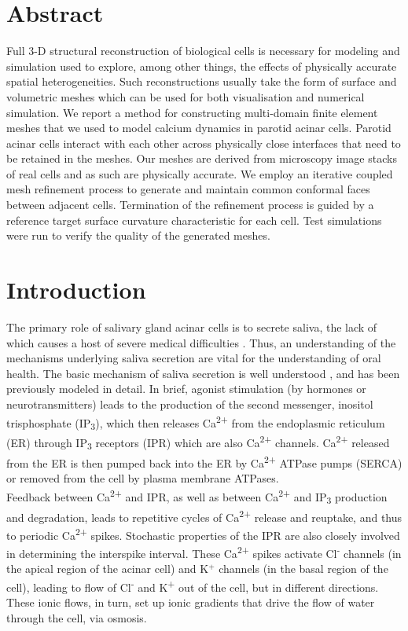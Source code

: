 \documentclass[10pt,letterpaper]{article}
\begin{document}
\section*{Abstract}
Full 3-D structural reconstruction of biological cells is necessary for modeling and simulation used to explore,
among other things, the effects of physically accurate spatial heterogeneities. Such reconstructions usually
take the form of surface and volumetric meshes which can be used for both visualisation and numerical
simulation. We report a method for constructing multi-domain finite element meshes that we used to model
calcium dynamics in parotid acinar cells. Parotid acinar cells interact with each other across physically close
interfaces that need to be retained in the meshes. Our meshes are derived from microscopy image stacks of
real cells and as such are physically accurate. We employ an iterative coupled mesh refinement process to
generate and maintain common conformal faces between adjacent cells. Termination of the refinement
process is guided by a reference target surface curvature characteristic for each cell. Test simulations were
run to verify the quality of the generated meshes.\\

\section*{Introduction}
The primary role of salivary gland acinar cells is to secrete saliva, the lack of which causes a host of severe medical difficulties \cite{fox1985,melvin1991}. Thus, an understanding of the mechanisms underlying saliva secretion are vital for the understanding of oral health.  The basic mechanism of saliva secretion is well understood \cite{nauntofte1992}, and has been previously modeled in detail.
In brief, agonist stimulation (by hormones or neurotransmitters) leads to the production of the second messenger, inositol trisphosphate (IP\textsubscript{3}), which then releases Ca\textsuperscript{2+} from the endoplasmic reticulum (ER) through IP\textsubscript{3} receptors (IPR) which are also Ca\textsuperscript{2+} channels. Ca\textsuperscript{2+} released from the ER is then pumped back into the ER by Ca\textsuperscript{2+} ATPase pumps (SERCA) or removed from the cell by plasma membrane ATPases.\\

Feedback between Ca\textsuperscript{2+} and IPR, as well as between Ca\textsuperscript{2+} and IP\textsubscript{3} production and degradation, leads to repetitive cycles of Ca\textsuperscript{2+} release and reuptake, and thus to periodic Ca\textsuperscript{2+} spikes. Stochastic properties of the IPR are also closely involved in determining the interspike interval.
These Ca\textsuperscript{2+} spikes activate Cl\textsuperscript{-} channels (in the apical region of the acinar cell) and K$^+$ channels (in the basal region of the cell), leading to flow of Cl\textsuperscript{-} and K\textsuperscript{+} out of the cell, but in different directions. These ionic flows, in turn, set up ionic gradients that drive the flow of water through the cell, via osmosis.\\
\end{document}
